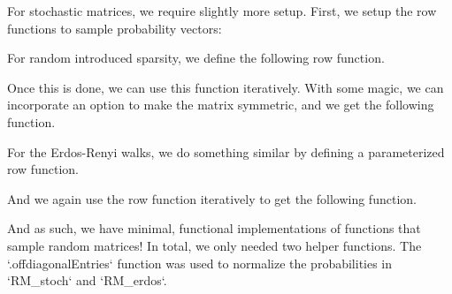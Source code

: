 For stochastic matrices, we require slightly more setup. First, we setup the row functions to sample probability vectors:



For random introduced sparsity, we define the following row function.



Once this is done, we can use this function iteratively. With some magic, we can incorporate an option to make the matrix symmetric, and we get the following function.




For the Erdos-Renyi walks, we do something similar by defining a parameterized row function.



And we again use the row function iteratively to get the following function.



And as such, we have minimal, functional implementations of functions that sample random matrices! In total, we only needed two helper functions. The `.offdiagonalEntries` function was used to normalize the probabilities in `RM_stoch` and `RM_erdos`.


